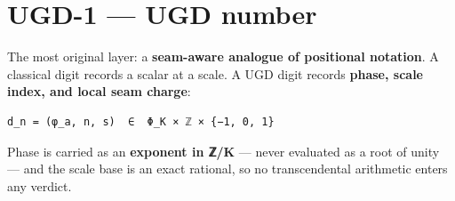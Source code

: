 \hypertarget{ugd-1-ugd-number}{%
\section{UGD-1 --- UGD number}\label{ugd-1-ugd-number}}

The most original layer: a \textbf{seam-aware analogue of positional notation}.
A classical digit records a scalar at a scale. A UGD digit records
\textbf{phase, scale index, and local seam charge}:

\begin{verbatim}
d_n = (φ_a, n, s)  ∈  Φ_K × ℤ × {−1, 0, 1}
\end{verbatim}

Phase is carried as an \textbf{exponent in ℤ/K} --- never evaluated as a root of
unity --- and the scale base is an exact rational, so no transcendental
arithmetic enters any verdict.

